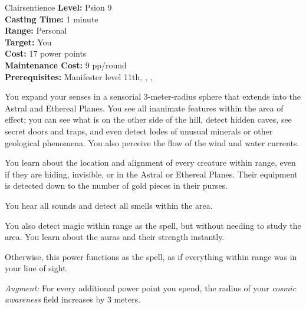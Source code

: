 {Clairsentience}
{
	\textbf{Level:}
	Psion 9\\
	\textbf{Casting Time:}
	1 minute\\
	\textbf{Range:}
	Personal\\
	\textbf{Target:}
	You\\
	\textbf{Cost:}
	17 power points\\
	\textbf{Maintenance Cost:}
	9 pp/round\\
	\textbf{Prerequisites:}
	Manifester level 11th, , , \\
}
{
	You expand your senses in a sensorial 3-meter-radius sphere that extends into the Astral and Ethereal Planes. You see all inanimate features within the area of effect; you can see what is on the other side of the hill, detect hidden caves, see secret doors and traps, and even detect lodes of unusual minerals or other geological phenomena. You also perceive the flow of the wind and water currents.

	You learn about the location and alignment of every creature within range, even if they are hiding, invisible, or in the Astral or Ethereal Planes. Their equipment is detected down to the number of gold pieces in their purses.

	You hear all sounds and detect all smells within the area.

	You also detect magic within range as the  spell, but without needing to study the area. You learn about the auras and their strength instantly.

	Otherwise, this power functions as the  spell, as if everything within range was in your line of sight.

	\textit{Augment:} For every additional power point you spend, the radius of your \emph{cosmic awareness} field increases by 3 meters.
}